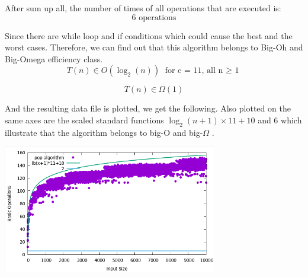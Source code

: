 \documentclass[11pt]{article}
\begin{document}
After sum up all, the number of times of all operations that are executed is$\colon$
\[
\text{6 operations}
\]

Since there are while loop and if conditions which could cause the best and the worst cases. Therefore, we can find out that this algorithm belongs to Big-Oh and Big-Omega efficiency class.
\[
    T(n) \in O(\log_2(n)) \text{ for c = 11, all n $\geq$ 1}    
\]

\[
    T(n) \in \Omega(1)
\]

And the resulting data file is plotted, we get the following. Also
plotted on the same axes are the scaled standard functions $ \log_2(n+1) \times 11 + 10$ and
6 which illustrate that the algorithm belongs to big-O and big-$\Omega$ .

\begin{center}
  \includegraphics[width=0.7\textwidth]{pop_function.png}
\end{center}
\newpage
\end{document}
